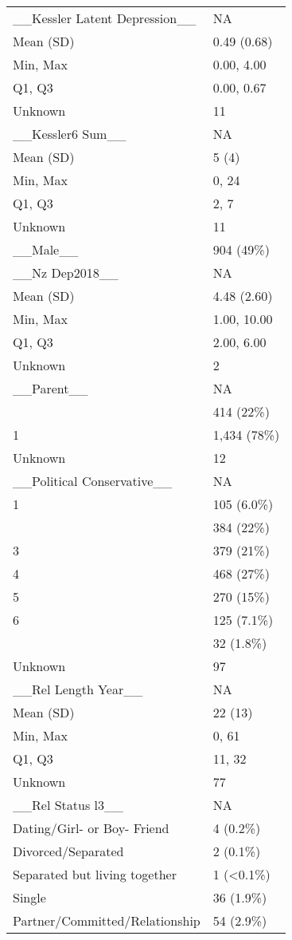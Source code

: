 \documentclass[
  singlecolumn]{article}
\begin{document}
\begin{tabular}[t]{ll}
\_\_Kessler Latent Depression\_\_ & NA\\
Mean (SD) & 0.49 (0.68)\\
\addlinespace
Min, Max & 0.00, 4.00\\
Q1, Q3 & 0.00, 0.67\\
Unknown & 11\\
\_\_Kessler6 Sum\_\_ & NA\\
Mean (SD) & 5 (4)\\
\addlinespace
Min, Max & 0, 24\\
Q1, Q3 & 2, 7\\
Unknown & 11\\
\_\_Male\_\_ & 904 (49\%)\\
\_\_Nz Dep2018\_\_ & NA\\
\addlinespace
Mean (SD) & 4.48 (2.60)\\
Min, Max & 1.00, 10.00\\
Q1, Q3 & 2.00, 6.00\\
Unknown & 2\\
\_\_Parent\_\_ & NA\\
\addlinespace
0 & 414 (22\%)\\
1 & 1,434 (78\%)\\
Unknown & 12\\
\_\_Political Conservative\_\_ & NA\\
1 & 105 (6.0\%)\\
\addlinespace
2 & 384 (22\%)\\
3 & 379 (21\%)\\
4 & 468 (27\%)\\
5 & 270 (15\%)\\
6 & 125 (7.1\%)\\
\addlinespace
7 & 32 (1.8\%)\\
Unknown & 97\\
\_\_Rel Length Year\_\_ & NA\\
Mean (SD) & 22 (13)\\
Min, Max & 0, 61\\
\addlinespace
Q1, Q3 & 11, 32\\
Unknown & 77\\
\_\_Rel Status l3\_\_ & NA\\
Dating/Girl- or Boy- Friend & 4 (0.2\%)\\
Divorced/Separated & 2 (0.1\%)\\
\addlinespace
Separated but living together & 1 (<0.1\%)\\
Single & 36 (1.9\%)\\
Partner/Committed/Relationship & 54 (2.9\%)\\

\end{tabular}
\end{document}
